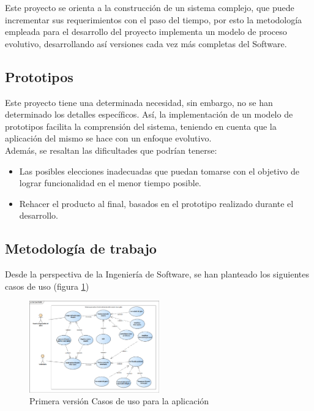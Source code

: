 \documentclass[letterpaper, 10 pt, conference]{ieeeconf}  %
\begin{document}
Este proyecto se orienta a la construcci\'on de un sistema complejo, que puede incrementar sus requerimientos con el paso del tiempo, por esto la metodolog\'ia empleada para el desarrollo del proyecto implementa un modelo de proceso evolutivo, desarrollando as\'i versiones cada vez m\'as completas del Software.\\



\subsection{Prototipos}

Este proyecto tiene una determinada necesidad, sin embargo, no se han determinado los detalles espec\'ificos. As\'i, la implementaci\'on de un modelo de prototipos facilita la comprensi\'on del sistema, teniendo en cuenta que la aplicaci\'on del mismo se hace con un enfoque evolutivo.\\

Adem\'as, se resaltan las dificultades que podr\'ian tenerse:

\begin{itemize}
    \item Las posibles elecciones inadecuadas que puedan tomarse con el objetivo de lograr funcionalidad en el menor tiempo posible.
    \item Rehacer el producto al final, basados en el prototipo realizado durante el desarrollo.
\end{itemize}


\subsection{Metodolog\'ia de trabajo}

Desde la perspectiva de la Ingenier\'ia de Software, se han planteado los siguientes casos de uso (figura \ref{fig:Casosdeuso})

\begin{figure}
\centering
\includegraphics[width=0.5\textwidth]{casousoheartcat.png}
\caption{Primera versi\'on Casos de uso para la aplicaci\'on}
\label{fig:Casosdeuso}
\end{figure}
\end{document}
